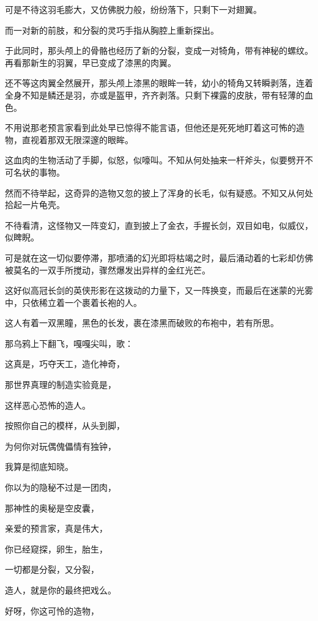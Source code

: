 \documentclass[UTF8]{article}
\begin{document}
\par 可是不待这羽毛膨大，又仿佛脱力般，纷纷落下，只剩下一对翅翼。
\par 而一对新的前肢，和分裂的灵巧手指从胸腔上重新探出。
\par 于此同时，那头颅上的骨骼也经历了新的分裂，变成一对犄角，带有神秘的螺纹。再看那新生的羽翼，早已变成了漆黑的肉翼。
\par 还不等这肉翼全然展开，那头颅上漆黑的眼眸一转，幼小的犄角又转瞬剥落，连着全身不知是鳞还是羽，亦或是盔甲，齐齐剥落。只剩下裸露的皮肤，带有轻薄的血色。
\par 不用说那老预言家看到此处早已惊得不能言语，但他还是死死地盯着这可怖的造物，直视着那双无限深邃的眼眸。
\par 这血肉的生物活动了手脚，似怒，似嚎叫。不知从何处抽来一杆斧头，似要劈开不可名状的事物。
\par 然而不待举起，这奇异的造物又忽的披上了浑身的长毛，似有疑惑。不知又从何处拾起一片龟壳。
\par 不待看清，这怪物又一阵变幻，直到披上了金衣，手握长剑，双目如电，似威仪，似睥睨。
\par 可是就在这一切似要停滞，那喷涌的幻光即将枯竭之时，最后涌动着的七彩却仿佛被莫名的一双手所搅动，骤然爆发出异样的金红光芒。
\par 这好似高冠长剑的英侠形影在这拨动的力量下，又一阵换变，而最后在迷蒙的光雾中，只依稀立着一个裹着长袍的人。
\par 这人有着一双黑瞳，黑色的长发，裹在漆黑而破败的布袍中，若有所思。
\\[0.6cm]
\par 那乌鸦上下翻飞，嘎嘎尖叫，歌：
\\[0.6cm]
\par 这真是，巧夺天工，造化神奇，
\par 那世界真理的制造实验竟是，
\par 这样恶心恐怖的造人。
\par 按照你自己的模样，从头到脚，
\par 为何你对玩偶傀儡情有独钟，
\par 我算是彻底知晓。
\par 你以为的隐秘不过是一团肉，
\par 那神性的奥秘是空皮囊，
\par 亲爱的预言家，真是伟大，
\par 你已经窥探，卵生，胎生，
\par 一切都是分裂，又分裂，
\par 造人，就是你的最终把戏么。
\par 好呀，你这可怜的造物，
\end{document}
